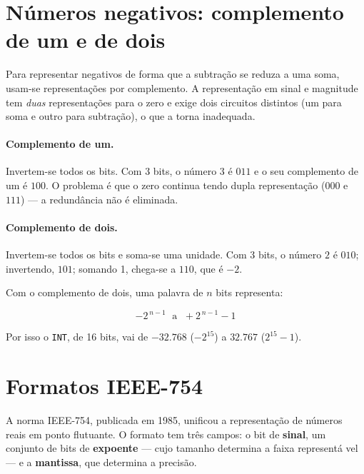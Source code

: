 \section{Números negativos: complemento de um e de dois}

Para representar negativos de forma que a subtração se reduza a uma soma, usam-se representações por
complemento. A representação em sinal e magnitude tem \emph{duas} representações para o zero e exige
dois circuitos distintos (um para soma e outro para subtração), o que a torna inadequada.

\paragraph{Complemento de um.} Invertem-se todos os bits. Com 3 bits, o número $3$ é $011$ e o seu
complemento de um é $100$. O problema é que o zero continua tendo dupla representação ($000$ e
$111$) --- a redundância não é eliminada.

\paragraph{Complemento de dois.} Invertem-se todos os bits e soma-se uma unidade. Com 3 bits, o
número $2$ é $010$; invertendo, $101$; somando 1, chega-se a $110$, que é $-2$.

Com o complemento de dois, uma palavra de $n$ bits representa:

\begin{equation}
  -2^{\,n-1} \;\text{ a }\; +2^{\,n-1} - 1
  \label{eq:faixa-complemento-dois}
\end{equation}

Por isso o \texttt{INT}, de 16 bits, vai de $-32.768$ ($-2^{15}$) a $32.767$ ($2^{15}-1$).


\section{Formatos IEEE-754}

A norma IEEE-754, publicada em 1985, unificou a representação de números reais em ponto flutuante. O
formato tem três campos: o bit de \textbf{sinal}, um conjunto de bits de \textbf{expoente} --- cujo
tamanho determina a faixa representá vel --- e a \textbf{mantissa}, que determina a precisão.

